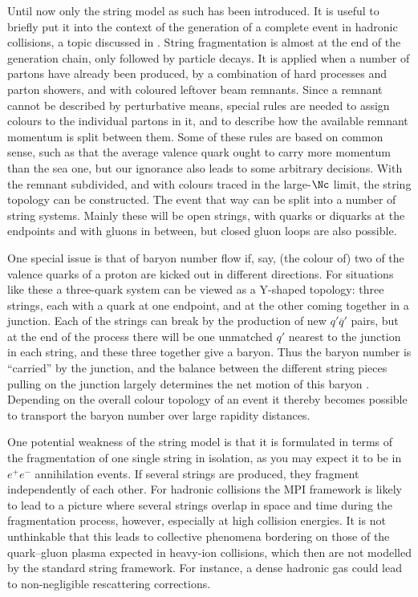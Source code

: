Until now only the string model as such has been introduced. It is 
useful to briefly put it into the context of the generation of a 
complete event in hadronic collisions, a topic discussed in 
. String fragmentation is almost at the end of the
generation chain, only followed by particle decays. It is applied when
a number of partons have already been produced,
by a combination of hard processes and parton showers, and with
coloured leftover beam remnants. Since a remnant cannot be described 
by perturbative means, special rules are needed to assign colours to 
the individual partons in it, and to describe how the available 
remnant momentum is split between them. Some of these rules are 
based on common sense, such as that the average valence quark ought to 
carry more momentum than the sea one, but our ignorance also leads to 
some arbitrary decisions. With the remnant subdivided, and with colours 
traced in the large-$\Nc$ limit, the string topology can be constructed. 
The event that way can be split into a number of string systems. 
Mainly these will be open strings, with quarks or diquarks at the 
endpoints and with gluons in between, but closed gluon loops are 
also possible. 

One special issue is that of baryon number flow if, say, (the colour 
of) two of the valence quarks of a proton are kicked out in different 
directions. For situations like these a three-quark system can be 
viewed as a Y-shaped topology: three strings, each with a quark at 
one endpoint, and at the other coming together in a junction. 
Each of the strings can break by the production of new 
$q'\overline{q}'$ pairs, but at the end of the process there will be one
unmatched $q'$ nearest to the junction in each string, and these 
three together give a baryon. Thus the baryon number is ``carried''
by the junction, and the balance between the different string pieces
pulling on the junction largely determines the net motion of this
baryon \cite{Sjostrand:2002ip}. Depending on the overall colour 
topology of an event it thereby becomes possible to transport 
the baryon number over large rapidity distances.

One potential weakness of the string model is that it is formulated
in terms of the fragmentation of one single string in isolation,
as you may expect it to be in $e^+e^-$ annihilation events. 
If several strings are produced, they fragment independently of each 
other. For hadronic collisions the MPI framework is likely to lead to 
a picture where several strings overlap in space and time during the 
fragmentation process, however, especially at high collision energies. 
It is not unthinkable that this leads to collective phenomena bordering 
on those of the quark--gluon plasma expected in heavy-ion collisions, 
which then are not modelled by the standard string framework. 
For instance, a dense hadronic gas could lead to non-negligible
rescattering corrections.

